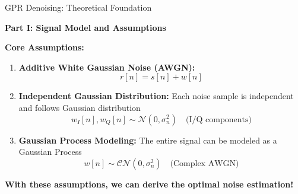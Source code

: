 \documentclass[aspectratio=169]{beamer}
\begin{document}
\begin{frame}{GPR Denoising: Theoretical Foundation}
\begin{center}
\textcolor{zjutblue}{\Large \textbf{Part I: Signal Model and Assumptions}}
\end{center}

\vspace{0.5cm}
\textbf{Core Assumptions:}
\begin{enumerate}
\item \textbf{Additive White Gaussian Noise (AWGN):}
   \begin{equation}
   r[n] = s[n] + w[n]
   \end{equation}

\item \textbf{Independent Gaussian Distribution:} Each noise sample is independent and follows Gaussian distribution
   \begin{equation}
   w_I[n], w_Q[n] \sim \mathcal{N}(0, \sigma_n^2) \quad \text{(I/Q components)}
   \end{equation}

\item \textbf{Gaussian Process Modeling:} The entire signal can be modeled as a Gaussian Process
   \begin{equation}
   w[n] \sim \mathcal{CN}(0, \sigma_n^2) \quad \text{(Complex AWGN)}
   \end{equation}
\end{enumerate}

\vspace{0.3cm}
\begin{center}
\textcolor{zjutgreen}{\textbf{With these assumptions, we can derive the optimal noise estimation!}}
\end{center}
\end{frame}
\end{document}
